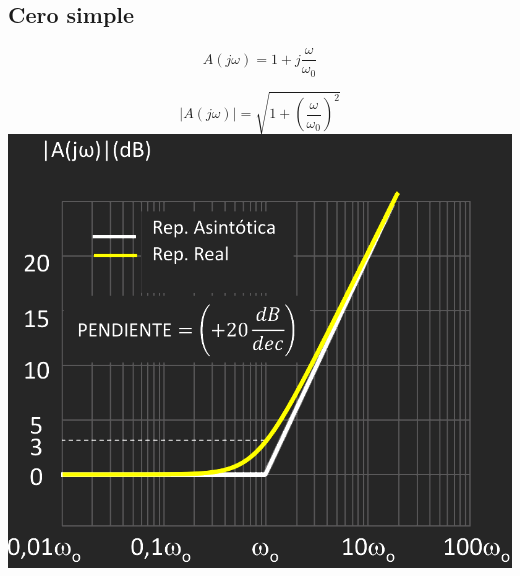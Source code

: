 \documentclass{article}
\begin{document}
\subsection{Cero simple}
$$
A (j \omega) = 1 + j \frac{\omega}{\omega_0}
$$
\begin{minipage}{0.49\textwidth}
$$
|A (j \omega)| = \sqrt{1 + \left(\frac{\omega}{\omega_0}\right)^2}
$$
    \centering
    \includegraphics[width=\textwidth]{figbode241.jpg} 
\end{minipage}
\end{document}
